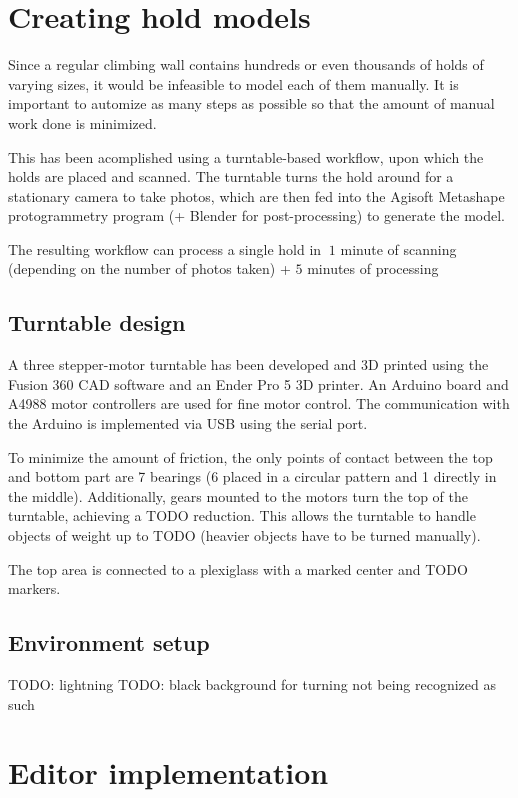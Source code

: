 \section{Creating hold models}
Since a regular climbing wall contains hundreds or even thousands of holds of varying sizes, it would be infeasible to model each of them manually.
It is important to automize as many steps as possible so that the amount of manual work done is minimized.

This has been acomplished using a turntable-based workflow, upon which the holds are placed and scanned.
The turntable turns the hold around for a stationary camera to take photos, which are then fed into the Agisoft Metashape protogrammetry program (+ Blender for post-processing) to generate the model.

The resulting workflow can process a single hold in $~1$ minute of scanning (depending on the number of photos taken) + $5$ minutes of processing

\subsection{Turntable design}
A three stepper-motor turntable has been developed and 3D printed using the Fusion 360 CAD software and an Ender Pro 5 3D printer.
An Arduino board and A4988 motor controllers are used for fine motor control.
The communication with the Arduino is implemented via USB using the serial port.


To minimize the amount of friction, the only points of contact between the top and bottom part are 7 bearings (6 placed in a circular pattern and 1 directly in the middle).
Additionally, gears mounted to the motors turn the top of the turntable, achieving a TODO reduction.
This allows the turntable to handle objects of weight up to TODO (heavier objects have to be turned manually).



The top area is connected to a plexiglass with a marked center and TODO markers.

\subsection{Environment setup}
TODO: lightning
TODO: black background for turning not being recognized as such




\section{Editor implementation}

